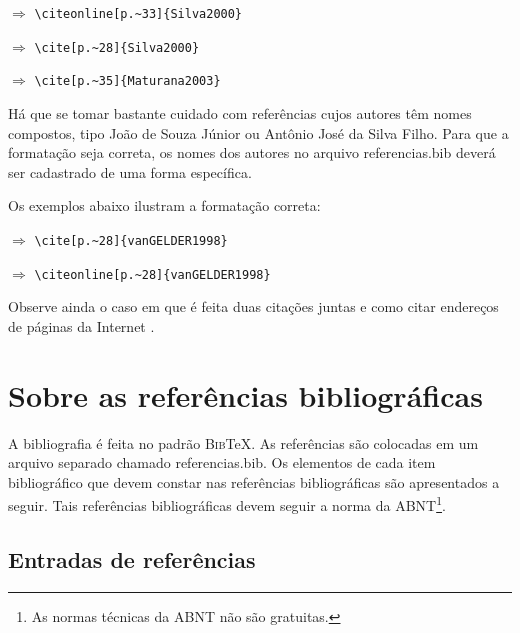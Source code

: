 \begin{apendicesenv}
     $\Longrightarrow$ \verb|\citeonline[p.~33]{Silva2000}|

    \cite[p.~28]{Silva2000} $\Longrightarrow$ \verb|\cite[p.~28]{Silva2000}|

    \cite[p.~35]{Maturana2003} $\Longrightarrow$ \verb|\cite[p.~35]{Maturana2003}|

    \vspace{4ex}

    Há que se tomar bastante cuidado com referências cujos autores têm nomes compostos, tipo João de Souza Júnior ou Antônio José da Silva Filho.
    Para que a formatação seja correta, os nomes dos autores no arquivo {\color{red} referencias.bib} deverá ser cadastrado de uma forma específica.

    Os exemplos abaixo ilustram a formatação correta:

    \cite[p.~28]{vanGELDER1998} $\Longrightarrow$ \verb|\cite[p.~28]{vanGELDER1998}|

     $\Longrightarrow$ \verb|\citeonline[p.~28]{vanGELDER1998}|

    \vspace{4ex}

    Observe ainda o caso em que é feita duas citações juntas \cite{Silva2000, nunes2017local} e como citar endereços de páginas da Internet \cite{IRL2014}.


    \chapter{Sobre as referências bibliográficas}
    \label{chap_sobre_as_referencias_bibliograficas}

    A bibliografia é feita no padrão \textsc{Bib}\TeX{}.
    As referências são colocadas em um arquivo separado chamado {\color{red} referencias.bib}.
    Os elementos de cada item bibliográfico que devem constar nas referências bibliográficas são apresentados a seguir.
    Tais referências bibliográficas devem seguir a norma  da ABNT\footnote{As normas técnicas da ABNT não são gratuitas.}.

    \section{Entradas de referências}
    \label{sec_entradas_de_referencias}


\end{apendicesenv}
